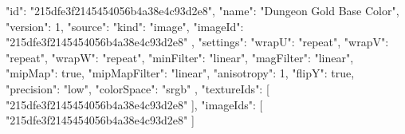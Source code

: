 {
  "id": "215dfe3f2145454056b4a38e4c93d2e8",
  "name": "Dungeon Gold Base Color",
  "version": 1,
  "source": {
    "kind": "image",
    "imageId": "215dfe3f2145454056b4a38e4c93d2e8"
  },
  "settings": {
    "wrapU": "repeat",
    "wrapV": "repeat",
    "wrapW": "repeat",
    "minFilter": "linear",
    "magFilter": "linear",
    "mipMap": true,
    "mipMapFilter": "linear",
    "anisotropy": 1,
    "flipY": true,
    "precision": "low",
    "colorSpace": "srgb"
  },
  "textureIds": [
    "215dfe3f2145454056b4a38e4c93d2e8"
  ],
  "imageIds": [
    "215dfe3f2145454056b4a38e4c93d2e8"
  ]
}
